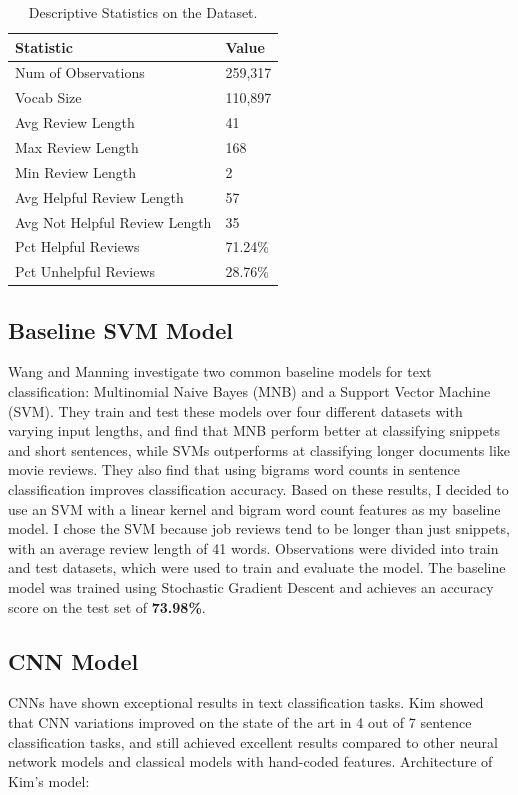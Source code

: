 \documentclass[11pt,a4paper]{article}
\begin{document}
	\begin{table}[h]
	\begin{center}
	\begin{tabular}{|l|l|}
		\hline \textbf{Statistic} & \textbf{Value} \\ \hline
		Num of Observations & 259,317 \\
		Vocab Size & 110,897 \\
		Avg Review Length & 41 \\
		Max Review Length & 168 \\
		Min Review Length & 2 \\
		Avg Helpful Review Length & 57 \\
		Avg Not Helpful Review Length & 35 \\
		Pct Helpful Reviews & 71.24\% \\
		Pct Unhelpful Reviews & 28.76\% \\
		\hline
	\end{tabular}
	\caption[scale=0.75]{Descriptive Statistics on the Dataset.}
	\end{center}
	\end{table}

		
	\subsection{Baseline SVM Model}
	Wang and Manning \cite{Wang} investigate two common baseline models for text classification: Multinomial Naive Bayes (MNB) and a Support Vector Machine (SVM). They train and test these models over four different datasets with varying input lengths, and find that MNB perform better at classifying snippets and short sentences, while SVMs outperforms at classifying longer documents like movie reviews. They also find that using bigrams word counts in sentence classification improves classification accuracy. Based on these results, I decided to use an SVM with a linear kernel and bigram word count features as my baseline model. I chose the SVM because job reviews tend to be longer than just snippets, with an average review length of 41 words. Observations were divided into train and test datasets, which were used to train and evaluate the model. The baseline model was trained using Stochastic Gradient Descent and achieves an accuracy score on the test set of \textbf{73.98\%}.	
			
	\subsection{CNN Model}
	CNNs have shown exceptional results in text classification tasks. Kim \cite{Kim} showed that CNN variations improved on the state of the art in 4 out of 7 sentence classification tasks, and still achieved excellent results compared to other neural network models and classical models with hand-coded features. Architecture of Kim's model:
	
\end{document}
